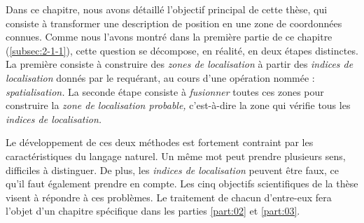 Dans ce chapitre, nous avons détaillé l'objectif principal de cette
thèse, qui consiste à transformer une description de position en une
zone de coordonnées connues. Comme nous l'avons montré dans la
première partie de ce chapitre (\ref{subsec:2-1-1}), cette question se
décompose, en réalité, en deux étapes distinctes. La première consiste
à construire des \emph{zones de localisation} à partir des
\emph{indices de localisation} donnés par le requérant, au cours d'une
opération nommée : \emph{spatialisation.} La seconde étape consiste à
\emph{fusionner} toutes ces zones pour construire la \emph{zone de
  localisation probable,} c'est-à-dire la zone qui vérifie tous les
\emph{indices de localisation.}

Le développement de ces deux méthodes est fortement contraint par les
caractéristiques du langage naturel. Un même mot peut prendre
plusieurs sens, difficiles à distinguer. De plus, les \emph{indices de
  localisation} peuvent être faux, ce qu'il faut également prendre en
compte. Les cinq objectifs scientifiques de la thèse visent à répondre
à ces problèmes. Le traitement de chacun d'entre-eux fera l'objet d'un
chapitre spécifique dans les parties \ref{part:02} et \ref{part:03}.

